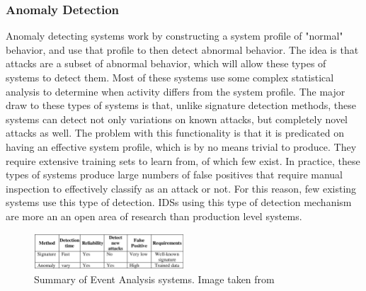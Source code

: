 \documentclass{acm_proc_article-sp}
\begin{document}
    	\subsubsection{Anomaly Detection}
    		Anomaly detecting systems work by constructing a system profile of "normal" behavior, and use that profile to then detect abnormal behavior. The idea is that attacks are a subset of abnormal behavior, which will allow these types of systems to detect them. Most of these systems use some complex statistical analysis to determine when activity differs from the system profile. The major draw to these types of systems is that, unlike signature detection methods, these systems can detect not only variations on known attacks, but completely novel attacks as well. The problem with this functionality is that it is predicated on having an effective system profile, which is by no means trivial to produce. They require extensive training sets to learn from, of which few exist. In practice, these types of systems produce large numbers of false positives that require manual inspection to effectively classify as an attack or not. For this reason, few existing systems use this type of detection. IDSs using this type of detection mechanism are more an an open area of research than production level systems. 
    		\begin{figure}[h!]
		\centering
		\includegraphics[width=0.5\textwidth]{signatreVSanomaly.png}
		\caption{Summary of Event Analysis systems. Image taken from \cite{Alenezi2012}}
		\label{comparison}
	\end{figure}
\end{document}
